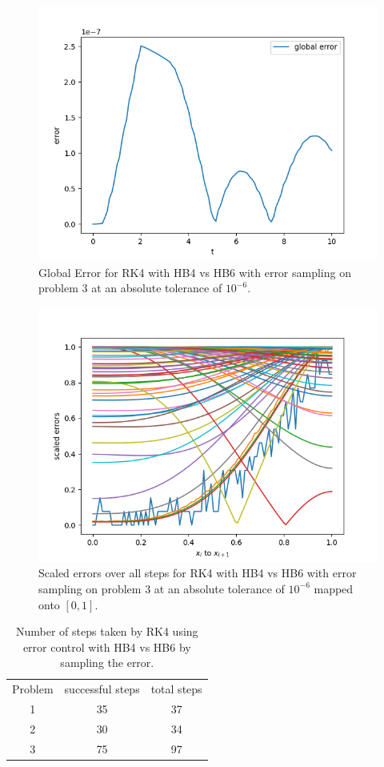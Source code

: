 \begin{figure}[H]
\centering
\includegraphics[width=0.7\linewidth]{./figures/rk4_with_hb4_hb6_sampling_p3_global_error}
\caption{Global Error for RK4 with HB4 vs HB6 with error sampling on problem 3 at an absolute tolerance of $10^{-6}$.}
\label{fig:rk4_with_hb4_hb6_sampling_p3_global_error}
\end{figure}

\begin{figure}[H]
\centering
\includegraphics[width=0.7\linewidth]{./figures/rk4_with_hb4_hb6_sampling_p3_scaled_errors}
\caption{Scaled errors over all steps for RK4 with HB4 vs HB6 with error sampling on problem 3 at an absolute tolerance of $10^{-6}$ mapped onto $[0, 1]$.}
\label{fig:rk4_with_hb4_hb6_sampling_p3_scaled_errors}
\end{figure}

\begin{table}[h]
\caption {Number of steps taken by RK4 using error control with HB4 vs HB6 by sampling the error.} \label{tab:rk4_with_hb4_hb6_sampling_nsteps}
\begin{center}
\begin{tabular}{ c c c } 
Problem & successful steps & total steps \\ 
1       & 35                         & 37 \\ 
2       & 30                         & 34 \\
3       & 75                         & 97 \\
\end{tabular}
\end{center}
\end{table}


